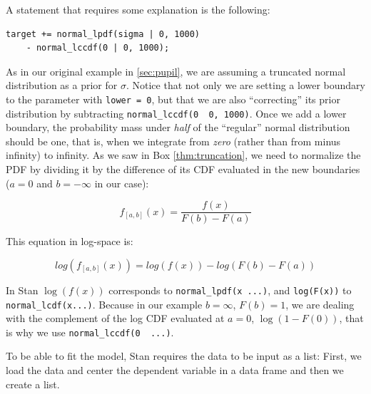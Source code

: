 \documentclass[12pt,]{krantz}
\newenvironment{Shaded}{\begin{snugshade}}{\end{snugshade}}
\newcommand{\DataTypeTok}[1]{\textcolor[rgb]{0.13,0.29,0.53}{#1}}
\newcommand{\KeywordTok}[1]{\textcolor[rgb]{0.13,0.29,0.53}{\textbf{#1}}}
\newcommand{\NormalTok}[1]{#1}
\newcommand{\OperatorTok}[1]{\textcolor[rgb]{0.81,0.36,0.00}{\textbf{#1}}}
\newcommand{\StringTok}[1]{\textcolor[rgb]{0.31,0.60,0.02}{#1}}
\theoremstyle{definition}
\theoremstyle{definition}
\theoremstyle{definition}
\theoremstyle{remark}
\begin{document}
A statement that requires some explanation is the following:

\begin{verbatim}
target += normal_lpdf(sigma | 0, 1000)
    - normal_lccdf(0 | 0, 1000);
\end{verbatim}

As in our original example in \ref{sec:pupil}, we are assuming a truncated normal distribution as a prior for \(\sigma\). Notice that not only we are setting a lower boundary to the parameter with \texttt{lower\ =\ 0}, but that we are also ``correcting'' its prior distribution by subtracting \texttt{normal\_lccdf(0\ \textbar{}\ 0,\ 1000)}. Once we add a lower boundary, the probability mass under \emph{half} of the ``regular'' normal distribution should be one, that is, when we integrate from \emph{zero} (rather than from minus infinity) to infinity. As we saw in Box \ref{thm:truncation}, we need to normalize the PDF by dividing it by the difference of its CDF evaluated in the new boundaries (\(a = 0\) and \(b = - \infty\) in our case):

\begin{equation}
f_{[a,b]}(x) = \frac{f(x)}{F(b) - F(a)}
\label{eq:truncPDF}
\end{equation}

This equation in log-space is:

\begin{equation}
log(f_{[a,b]}(x)) = log(f(x)) - log(F(b) - F(a))
\label{eq:truncPDF}
\end{equation}

In Stan \(\log(f(x))\) corresponds to \texttt{normal\_lpdf(x\ \textbar{}...)}, and \texttt{log(F(x))} to \texttt{normal\_lcdf(x\textbar{}...)}. Because in our example \(b=\infty\), \(F(b) = 1\), we are dealing with the complement of the log CDF evaluated at \(a =0\), \(\log(1 - F(0))\), that is why we use \texttt{normal\_lccdf(0\ \textbar{}\ ...)}.

To be able to fit the model, Stan requires the data to be input as a list: First, we load the data and center the dependent variable in a data frame and then we create a list.

\begin{Shaded}
\end{Shaded}
\end{document}
